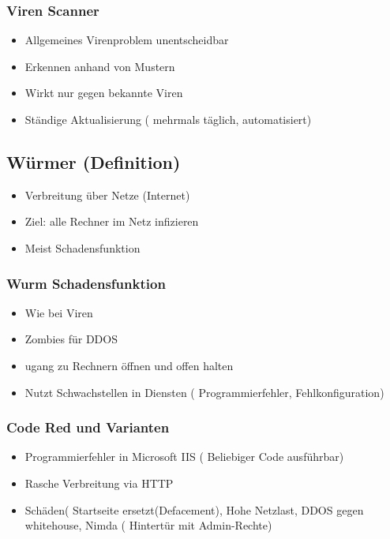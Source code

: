 	\subsubsection*{ Viren Scanner}
	\begin{itemize}
		\item Allgemeines Virenproblem unentscheidbar
		\item Erkennen anhand von Mustern
		\item Wirkt nur gegen bekannte Viren
		\item Ständige Aktualisierung ( mehrmals täglich, automatisiert)
	\end{itemize}
	
	\subsection*{ Würmer (Definition)}
	\begin{itemize}
		\item Verbreitung über Netze (Internet)
		\item Ziel: alle Rechner im Netz infizieren
		\item Meist Schadensfunktion
	\end{itemize}

\subsubsection*{ Wurm Schadensfunktion}
\begin{itemize}
	\item Wie bei Viren
	\item Zombies für DDOS
	\item ugang zu Rechnern öffnen und offen halten
	\item Nutzt Schwachstellen in Diensten ( Programmierfehler, Fehlkonfiguration)
\end{itemize}

\subsubsection*{ Code Red und Varianten}
\begin{itemize}
	\item Programmierfehler in Microsoft IIS ( Beliebiger Code ausführbar)
	\item Rasche Verbreitung via HTTP
	\item Schäden( Startseite ersetzt(Defacement), Hohe Netzlast, DDOS gegen whitehouse, Nimda ( Hintertür mit Admin-Rechte)
\end{itemize}

